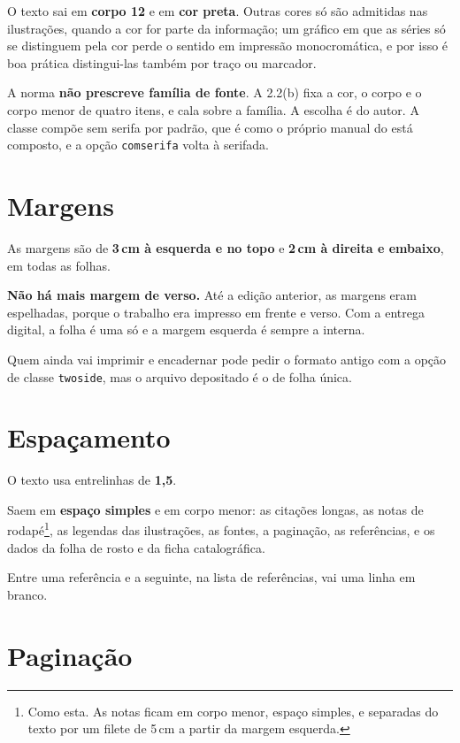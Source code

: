 \documentclass[dsc]{ufrj}
\begin{document}
  O texto sai em \textbf{corpo 12} e em \textbf{cor preta}. Outras cores só são
  admitidas nas ilustrações, quando a cor for parte da informação; um gráfico em
  que as séries só se distinguem pela cor perde o sentido em impressão
  monocromática, e por isso é boa prática distingui-las também por traço ou
  marcador.

  A norma \textbf{não prescreve família de fonte}. A 2.2(b) fixa a cor, o corpo
  e o corpo menor de quatro itens, e cala sobre a família. A escolha é do autor.
  A classe compõe sem serifa por padrão, que é como o próprio manual do
   está composto, e a opção \verb|comserifa| volta à serifada.

  \section{Margens}

  As margens são de \textbf{3\,cm à esquerda e no topo} e \textbf{2\,cm à
  direita e embaixo}, em todas as folhas.

  \textbf{Não há mais margem de verso.} Até a edição anterior, as margens eram
  espelhadas, porque o trabalho era impresso em frente e verso. Com a entrega
  digital, a folha é uma só e a margem esquerda é sempre a interna.

  Quem ainda vai imprimir e encadernar pode pedir o formato antigo com a opção
  de classe \verb|twoside|, mas o arquivo depositado é o de folha única.

  \section{Espaçamento}

  O texto usa entrelinhas de \textbf{1,5}.

  Saem em \textbf{espaço simples} e em corpo menor: as citações longas, as notas
  de rodapé\footnote{Como esta. As notas ficam em corpo menor, espaço simples, e
  separadas do texto por um filete de 5\,cm a partir da margem esquerda.}, as
  legendas das ilustrações, as fontes, a paginação, as referências, e os dados
  da folha de rosto e da ficha catalográfica.

  Entre uma referência e a seguinte, na lista de referências, vai uma linha em
  branco.

  \section{Paginação}\label{sec:paginacao}
\end{document}
